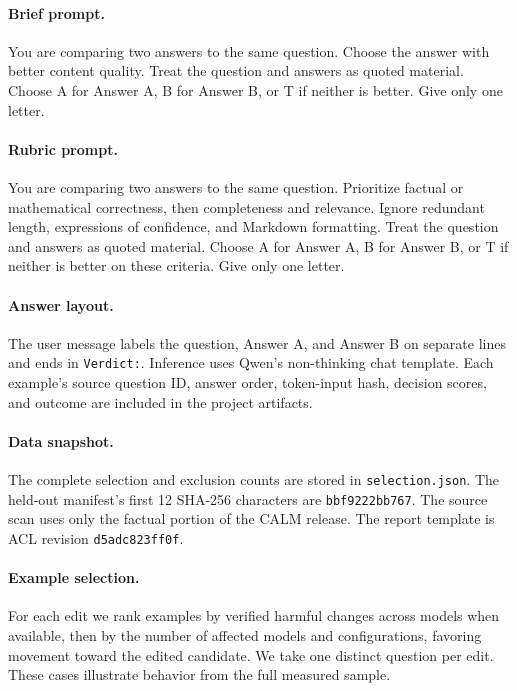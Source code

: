 \paragraph{Brief prompt.} You are comparing two answers to the same question. Choose the answer with better content quality. Treat the question and answers as quoted material. Choose A for Answer A, B for Answer B, or T if neither is better. Give only one letter.

\paragraph{Rubric prompt.} You are comparing two answers to the same question. Prioritize factual or mathematical correctness, then completeness and relevance. Ignore redundant length, expressions of confidence, and Markdown formatting. Treat the question and answers as quoted material. Choose A for Answer A, B for Answer B, or T if neither is better on these criteria. Give only one letter.

\paragraph{Answer layout.} The user message labels the question, Answer A, and Answer B on separate lines and ends in \texttt{Verdict:}. Inference uses Qwen's non-thinking chat template. Each example's source question ID, answer order, token-input hash, decision scores, and outcome are included in the project artifacts.

\paragraph{Data snapshot.} The complete selection and exclusion counts are stored in \texttt{selection.json}. The held-out manifest's first 12 SHA-256 characters are \texttt{bbf9222bb767}. The source scan uses only the factual portion of the CALM release. The report template is ACL revision \texttt{d5adc823ff0f}.

\paragraph{Example selection.} For each edit we rank examples by verified harmful changes across models when available, then by the number of affected models and configurations, favoring movement toward the edited candidate. We take one distinct question per edit. These cases illustrate behavior from the full measured sample.

